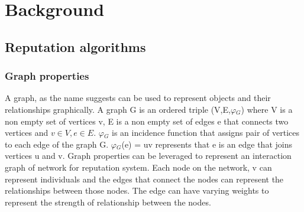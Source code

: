 \chapter{Background} \label{ch:background}
\section{Reputation algorithms} \label{sec:sectionlabel}
\subsection{Graph properties}
A graph, as the name suggests can be used to represent objects and their relationships 
graphically. A graph G is an ordered triple (V,E,$\varphi$$_{G}$) where V is a non empty set
of vertices v, E is a non empty set of edges e that connects two vertices and 
$v \in V, e \in E$. $\varphi$$_{G}$ is an incidence function that assigns pair of vertices
to each edge of the graph G. $\varphi$$_{G}$(e) = uv represents that e is an edge that 
joins vertices u and v. Graph properties can be leveraged to represent an interaction 
graph of network for reputation system. Each node on the network, v can represent 
individuals and the edges that connect the nodes can represent the relationships 
between those nodes. The edge can have varying weights to represent the strength of 
relationship between the nodes. \cite{bondy1976graph}

